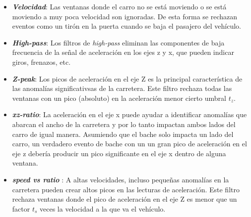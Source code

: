 		\begin{itemize}
			\item \emph{\textbf {Velocidad}}: Las ventanas donde el carro no se está moviendo o se está moviendo a muy poca velocidad son ignoradas. 
				De esta forma se rechazan eventos como un tirón en la puerta cuando se baja el pasajero del vehículo.\\
			\item \emph{\textbf {High-pass}}: Los filtros de \emph{high-pass} eliminan las componentes de baja frecuencia de la señal de aceleración
				en los ejes z y x, que pueden indicar giros, frenazos, etc.\\
			\item  \emph{\textbf {Z-peak}}: Los picos de aceleración en el eje Z es la principal característica de las anomalías significativsas de
				la carretera. Este filtro rechaza todas las ventanas con un pico (absoluto) en la aceleración menor cierto umbral $t_z$.\\
			\item \emph{\textbf {xz-ratio}}: La aceleración en el eje x puede ayudar a identificar anomalías que abarcan el ancho de la carretera
				y por lo tanto impactan ambos lados del carro de igual manera.  Asumiendo que el bache solo impacta un lado del carro, un verdadero
				evento de bache con un un gran pico de aceleración en el eje z debería producir un pico significante en el eje x dentro de alguna
				ventana.\\
			\item \emph{\textbf {speed vs ratio }}:	A altas velocidades, incluso pequeñas anomalías en la carretera pueden crear altos picos en las
				lecturas de aceleración. Este filtro rechaza ventanas donde el pico de aceleración en el eje Z es menor que un factor $t_s$ veces la
				velocidad a la que va el vehículo.
		\end{itemize}


